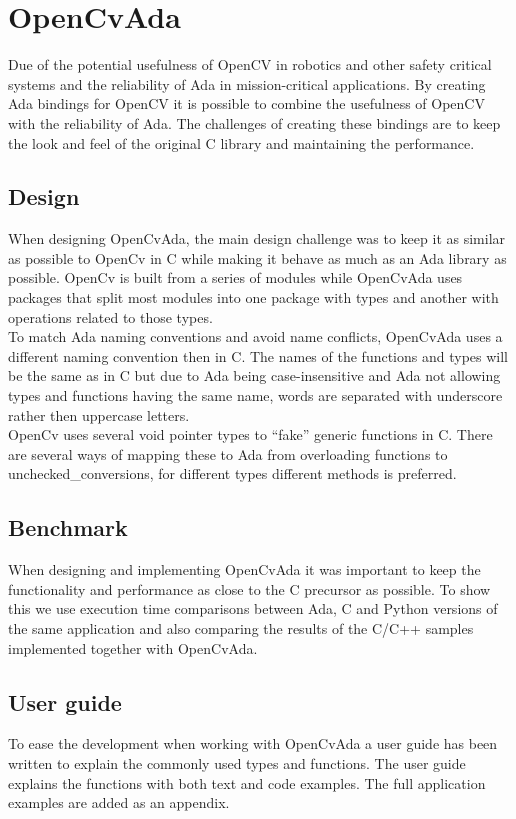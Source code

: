 \section{OpenCvAda}
Due of the potential usefulness of OpenCV in robotics and other safety critical systems and the reliability of Ada in mission-critical applications. By creating Ada bindings for OpenCV it is possible to combine the usefulness of OpenCV with the reliability of Ada. The challenges of creating these bindings are to keep the look and feel of the original C library and maintaining the performance.
\subsection{Design}
When designing OpenCvAda, the main design challenge was to keep it as similar as possible to OpenCv in C while making it behave as much as an Ada library as possible. OpenCv is built from a series of modules while OpenCvAda uses packages that split most modules into one package with types and another with operations related to those types.
\\
To match Ada naming conventions and avoid name conflicts, OpenCvAda uses a different naming convention then in C. The names of the functions and types will be the same as in C but due to Ada being case-insensitive and Ada not allowing types and functions having the same name, words are separated with underscore rather then uppercase letters.
\\
OpenCv uses several void pointer types to ``fake'' generic functions in C. There are several ways of mapping these to Ada from overloading functions to unchecked_conversions, for different types different methods is preferred.
\subsection{Benchmark}
When designing and implementing OpenCvAda it was important to keep the functionality and performance as close to the C precursor as possible. To show this we use execution time comparisons between Ada, C and Python versions of the same application and also comparing the results of the C/C++ samples implemented together with OpenCvAda.
\subsection{User guide}
To ease the development when working with OpenCvAda a user guide has been written to explain the commonly used types and functions. The user guide explains the functions with both text and code examples. The full application examples are added as an appendix.
